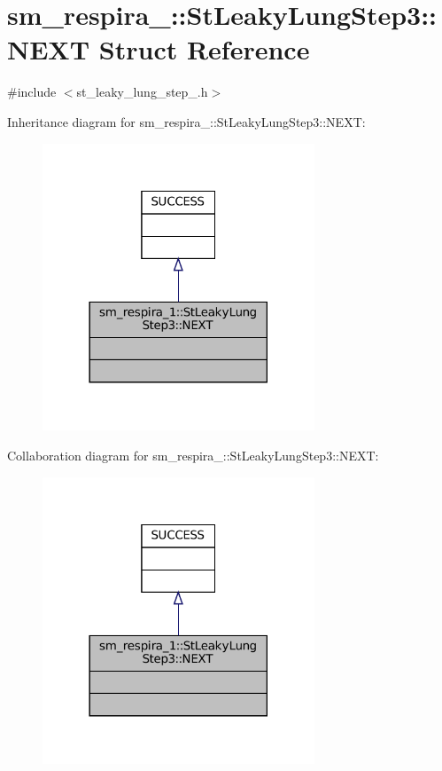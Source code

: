 \hypertarget{structsm__respira__1_1_1StLeakyLungStep3_1_1NEXT}{}\section{sm\+\_\+respira\+\_\+:\+:St\+Leaky\+Lung\+Step3\+:\+:N\+E\+XT Struct Reference}
\label{structsm__respira__1_1_1StLeakyLungStep3_1_1NEXT}


{\ttfamily \#include $<$st\+\_\+leaky\+\_\+lung\+\_\+step\+\_.\+h$>$}



Inheritance diagram for sm\+\_\+respira\+\_\+:\+:St\+Leaky\+Lung\+Step3\+:\+:N\+E\+XT\+:
\nopagebreak
\begin{figure}[H]
\begin{center}
\leavevmode
\includegraphics[width=230pt]{structsm__respira__1_1_1StLeakyLungStep3_1_1NEXT__inherit__graph}
\end{center}
\end{figure}


Collaboration diagram for sm\+\_\+respira\+\_\+:\+:St\+Leaky\+Lung\+Step3\+:\+:N\+E\+XT\+:
\nopagebreak
\begin{figure}[H]
\begin{center}
\leavevmode
\includegraphics[width=230pt]{structsm__respira__1_1_1StLeakyLungStep3_1_1NEXT__coll__graph}
\end{center}
\end{figure}


